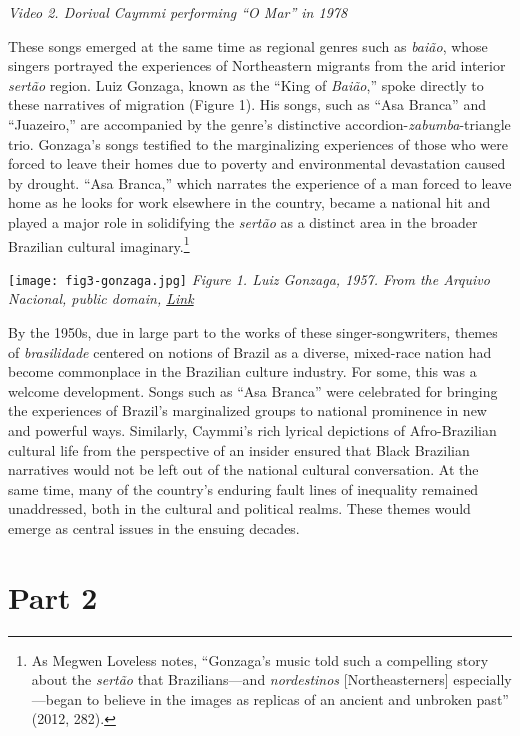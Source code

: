 \documentclass[twoside]{article}
\begin{document}
\emph{Video 2. Dorival Caymmi performing ``O Mar'' in 1978}

These songs emerged at the same time as regional genres such as
\emph{baião}, whose singers portrayed the experiences of Northeastern
migrants from the arid interior \emph{sertão} region. Luiz Gonzaga,
known as the ``King of \emph{Baião},'' spoke directly to these
narratives of migration (Figure 1). His songs, such as ``Asa Branca''
and ``Juazeiro,'' are accompanied by the genre's distinctive
accordion-\emph{zabumba}-triangle trio. Gonzaga's songs testified to the
marginalizing experiences of those who were forced to leave their homes
due to poverty and environmental devastation caused by drought. ``Asa
Branca,'' which narrates the experience of a man forced to leave home as
he looks for work elsewhere in the country, became a national hit and
played a major role in solidifying the \emph{sertão} as a distinct area
in the broader Brazilian cultural imaginary.\footnote{As Megwen Loveless
  notes, ``Gonzaga's music told such a compelling story about the
  \emph{sertão} that Brazilians---and \emph{nordestinos}
  {[}Northeasterners{]} especially---began to believe in the images as
  replicas of an ancient and unbroken past'' (2012, 282).}

\texttt{[image: fig3-gonzaga.jpg]} \emph{Figure 1. Luiz Gonzaga, 1957.
From the Arquivo Nacional, public domain,
\href{https://en.wikipedia.org/wiki/Luiz_Gonzaga\#/media/File:Luiz_Gonzaga_(1957).tif}{Link}}

By the 1950s, due in large part to the works of these
singer-songwriters, themes of \emph{brasilidade} centered on notions of
Brazil as a diverse, mixed-race nation had become commonplace in the
Brazilian culture industry. For some, this was a welcome development.
Songs such as ``Asa Branca'' were celebrated for bringing the
experiences of Brazil's marginalized groups to national prominence in
new and powerful ways. Similarly, Caymmi's rich lyrical depictions of
Afro-Brazilian cultural life from the perspective of an insider ensured
that Black Brazilian narratives would not be left out of the national
cultural conversation. At the same time, many of the country's enduring
fault lines of inequality remained unaddressed, both in the cultural and
political realms. These themes would emerge as central issues in the
ensuing decades.

\section*{Part 2}
\end{document}
